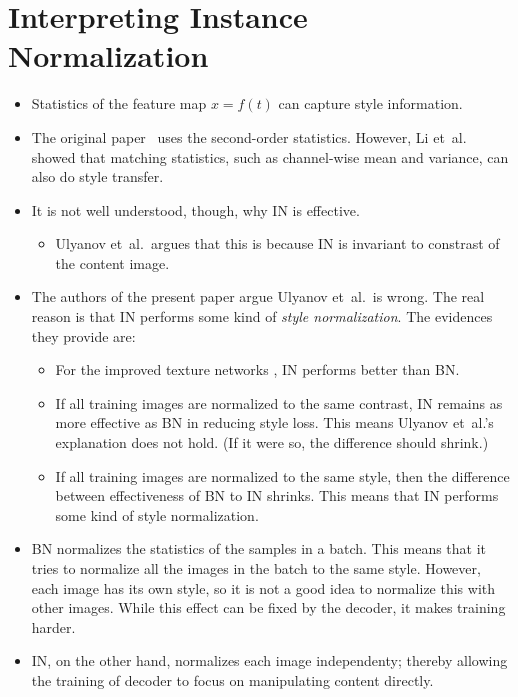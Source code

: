\documentclass[10pt]{article}
\newcommand{\etal}{{et~al.}}
\begin{document}
  \section{Interpreting Instance Normalization}

  \begin{itemize}
  	\item Statistics of the feature map $x = f(t)$ can capture style information.

  	\item The original paper \cite{Gatys:2016}\ uses the second-order statistics. However, Li \etal\ \cite{Li:2017} showed that matching statistics, such as channel-wise mean and variance, can also do style transfer.

  	\item It is not well understood, though, why IN is effective.
  	\begin{itemize}
  		\item Ulyanov \etal\ argues that this is because IN is invariant to constrast of the content image.
  	\end{itemize}

  	\item The authors of the present paper argue Ulyanov \etal\ is wrong. The real reason is that IN performs some kind of \emph{style normalization}. The evidences they provide are:
  	\begin{itemize}
  		\item For the improved texture networks \cite{Ulyanov:2017}, IN performs better than BN.

  		\item If all training images are normalized to the same contrast, IN remains as more effective as BN in reducing style loss. This means Ulyanov \etal's explanation does not hold. (If it were so, the difference should shrink.)

  		\item If all training images are normalized to the same style, then the difference between effectiveness of BN to IN shrinks. This means that IN performs some kind of style normalization.
  	\end{itemize}

  	\item BN normalizes the statistics of the samples in a batch. This means that it tries to normalize all the images in the batch to the same style. However, each image has its own style, so it is not a good idea to normalize this with other images. While this effect can be fixed by the decoder, it makes training harder.

  	\item IN, on the other hand, normalizes each image independenty; thereby allowing the training of decoder to focus on manipulating content directly.
  \end{itemize}
\end{document}
